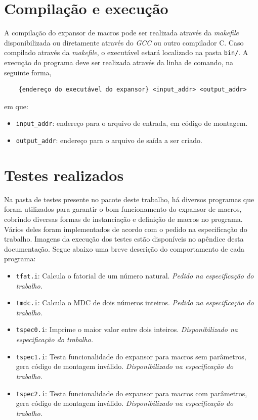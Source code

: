 \documentclass[12pt,a4paper]{article}
\numberwithin{equation}{section}
\begin{document}
\section{Compilação e execução}

A compilação do expansor de macros pode ser realizada através da \emph{makefile} disponibilizada ou diretamente através do \emph{GCC} ou outro compilador C. Caso compilado através da \emph{makefile}, o executável estará localizado na pasta \verb|bin/|. A execução do programa deve ser realizada através da linha de comando, na seguinte forma,

\begin{verbatim}
    {endereço do executável do expansor} <input_addr> <output_addr>
\end{verbatim}

em que:

\begin{itemize}
    \item \verb|input_addr|: endereço para o arquivo de entrada, em código de montagem.
    \item \verb|output_addr|: endereço para o arquivo de saída a ser criado.
\end{itemize}

\section{Testes realizados}

Na pasta de testes presente no pacote deste trabalho, há diversos programas que foram utilizados para garantir o bom funcionamento do expansor de macros, cobrindo diversas formas de instanciação e definição de macros no programa. Vários deles foram implementados de acordo com o pedido na especificação do trabalho. Imagens da execução dos testes estão disponíveis no apêndice desta documentação. Segue abaixo uma breve descrição do comportamento de cada programa:

\begin{itemize}
    \item \verb|tfat.i|: Calcula o fatorial de um número natural. \emph{Pedido na especificação do trabalho.}
    \item \verb|tmdc.i|: Calcula o MDC de dois números inteiros. \emph{Pedido na especificação do trabalho.}
    \item \verb|tspec0.i|: Imprime o maior valor entre dois inteiros. \emph{Disponibilizado na especificação do trabalho.}
    \item \verb|tspec1.i|: Testa funcionalidade do expansor para macros sem parâmetros, gera código de montagem inválido. \emph{Disponibilizado na especificação do trabalho.}
    \item \verb|tspec2.i|: Testa funcionalidade do expansor para macros com parâmetros, gera código de montagem inválido. \emph{Disponibilizado na especificação do trabalho.}
\end{itemize}
\end{document}

